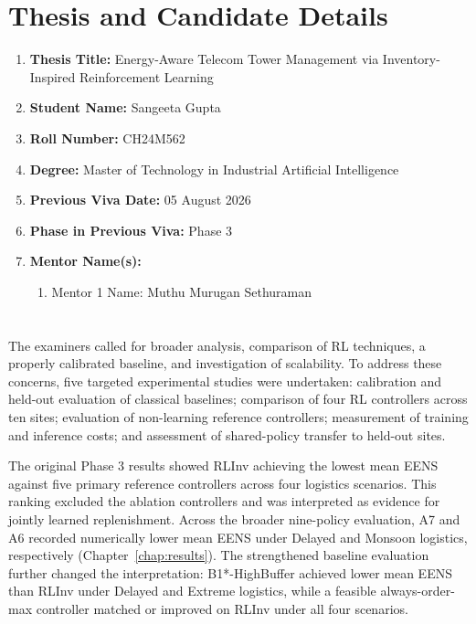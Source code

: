 
\section*{\centering Thesis and Candidate Details}

\vspace{\baselineskip}

\begin{enumerate}
    \item \textbf{Thesis Title:} Energy-Aware Telecom Tower Management via Inventory-Inspired Reinforcement Learning
    \item \textbf{Student Name:} Sangeeta Gupta
    \item \textbf{Roll Number:} CH24M562
    \item \textbf{Degree:} Master of Technology in Industrial Artificial Intelligence
    \item \textbf{Previous Viva Date:} 05 August 2026
    \item \textbf{Phase in Previous Viva:} Phase 3
    \item \textbf{Mentor Name(s):}
      \begin{enumerate}
        \renewcommand{\labelenumii}{(\roman{enumii})}
        \item Mentor 1 Name: Muthu Murugan Sethuraman
      \end{enumerate}
\end{enumerate}

\clearpage



\section{}
\label{sec:rebuttal_summary}

The examiners called for broader analysis, comparison of
RL techniques, a properly calibrated baseline, and
investigation of scalability. To address these concerns,
five targeted experimental studies were undertaken:
calibration and held-out evaluation of classical baselines;
comparison of four RL controllers across ten sites;
evaluation of non-learning reference controllers;
measurement of training and inference costs; and
assessment of shared-policy transfer to held-out sites.

The original Phase 3 results showed RLInv achieving the
lowest mean EENS against five primary reference controllers
across four logistics scenarios. This ranking excluded
the ablation controllers and was interpreted as evidence
for jointly learned replenishment. Across the broader
nine-policy evaluation, A7 and A6 recorded numerically
lower mean EENS under Delayed and Monsoon logistics,
respectively (Chapter~\ref{chap:results}). The strengthened
baseline evaluation further changed the interpretation:
B1*-HighBuffer achieved lower mean EENS than RLInv under
Delayed and Extreme logistics, while a feasible
always-order-max controller matched or improved on RLInv
under all four scenarios.

